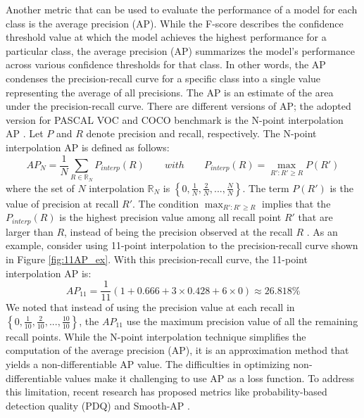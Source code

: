 Another metric that can be used to evaluate the performance of a model for each class is the average precision (AP). While the F-score describes the confidence threshold value at which the model achieves the highest performance for a particular class, the average precision (AP) summarizes the model's performance across various confidence thresholds for that class. In other words, the AP condenses the precision-recall curve for a specific class into a single value representing the average of all precisions. The AP is an estimate of the area under the precision-recall curve. There are different versions of AP; the adopted version for PASCAL VOC and COCO benchmark is the N-point interpolation AP \cite{n_point_interpolation_ap}. Let $P$ and $R$ denote precision and recall, respectively. The N-point interpolation AP is defined as follows:
\begin{equation}
    AP_N = \frac{1}{N} \sum_{R \in \mathbb{R}_N} P_{interp}(R) \qquad with \qquad P_{interp}(R) = \max_{{R}':{R}' \geq R} P({R}')
\end{equation}
where the set of $N$ interpolation $\mathbb{R}_N$ is $\left\{0, \frac{1}{N}, \frac{2}{N}, ..., \frac{N}{N}\right\}$. The term $P({R}')$ is the value of precision at recall ${R}'$. The condition $\max_{{R}':{R}' \geq R}$ implies that the $P_{interp}(R)$ is the highest precision value among all recall point ${R}'$ that are larger than $R$, instead of being the precision observed at the recall $R$ \cite{n_point_interpolation_ap}. As an example, consider using 11-point interpolation to the precision-recall curve shown in Figure \ref{fig:11AP_ex}. With this precision-recall curve, the 11-point interpolation AP is:
\begin{equation*}
    AP_{11} = \frac{1}{11} (1+0.666+3 \times 0.428 + 6 \times 0) \approx 26.818\% 
\end{equation*}
We noted that instead of using the precision value at each recall in $\left\{0, \frac{1}{10}, \frac{2}{10}, ..., \frac{10}{10}\right\}$, the $AP_{11}$ use the maximum precision value of all the remaining recall points. While the N-point interpolation technique simplifies the computation of the average precision (AP), it is an approximation method that yields a non-differentiable AP value. The difficulties in optimizing non-differentiable values make it challenging to use AP as a loss function. To address this limitation, recent research has proposed metrics like probability-based detection quality (PDQ) and Smooth-AP \cite{pdq_metric_2020, smoth_ap_metric_2020}.

